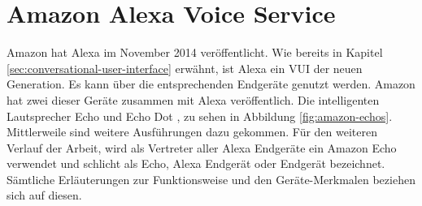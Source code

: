 \section{Amazon Alexa Voice Service}
\label{sec:alexa-voice-service}
Amazon hat Alexa im November 2014 veröffentlicht. Wie bereits in Kapitel \ref{sec:conversational-user-interface} erwähnt, ist Alexa ein \ac{VUI} der neuen Generation. Es kann über die entsprechenden Endgeräte genutzt werden. Amazon hat zwei dieser Geräte zusammen mit Alexa veröffentlich. Die intelligenten Lautsprecher Echo \cite{amazon-echo} und Echo Dot \cite{amazon-echo-dot}, zu sehen in Abbildung \ref{fig:amazon-echos}. Mittlerweile sind weitere Ausführungen dazu gekommen. Für den weiteren Verlauf der Arbeit, wird als Vertreter aller Alexa Endgeräte ein Amazon Echo verwendet und schlicht als Echo, Alexa Endgerät oder Endgerät bezeichnet. Sämtliche Erläuterungen zur Funktionsweise und den Geräte-Merkmalen beziehen sich auf diesen.

